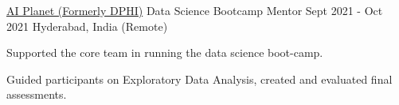\begin{cventries}
  \cventry
    {\href{https://aiplanet.com/}{AI Planet (Formerly DPHI)}} %
    {Data Science Bootcamp Mentor} %
    {Sept 2021 - Oct 2021} %
    {Hyderabad, India (Remote)} %
    {
      \begin{cvitems} 
        \item {Supported the core team in running the data science boot-camp.}
        \item{Guided participants on Exploratory Data Analysis, created and evaluated final assessments.}
      \end{cvitems}
    }
\end{cventries}
